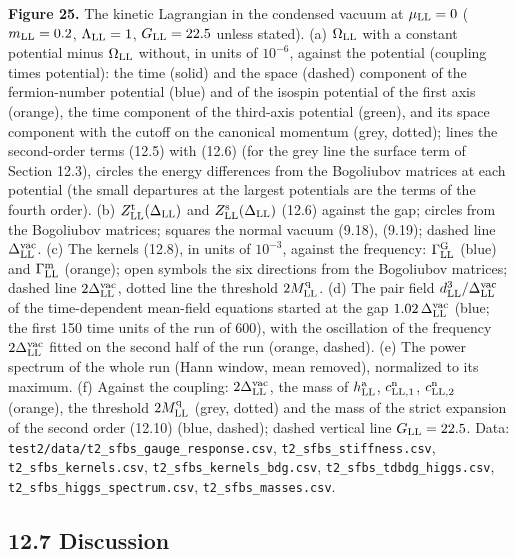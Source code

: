 \documentclass[
  10pt,
]{article}
\begin{document}
\textbf{Figure 25.} The kinetic Lagrangian in the condensed vacuum at
\(\mu_{\rm LL}=0\) (\(m_{\rm LL}=0.2\), \(\Lambda_{\rm LL}=1\),
\(G_{\rm LL}=22.5\) unless stated). (a) \(\Omega_{\rm LL}\) with a
constant potential minus \(\Omega_{\rm LL}\) without, in units of
\(10^{-6}\), against the potential (coupling times potential): the time
(solid) and the space (dashed) component of the fermion-number potential
(blue) and of the isospin potential of the first axis (orange), the time
component of the third-axis potential (green), and its space component
with the cutoff on the canonical momentum (grey, dotted); lines the
second-order terms (12.5) with (12.6) (for the grey line the surface
term of Section 12.3), circles the energy differences from the
Bogoliubov matrices at each potential (the small departures at the
largest potentials are the terms of the fourth order). (b)
\(Z^{\rm t}_{\rm LL}(\Delta_{\rm LL})\) and
\(Z^{\rm s}_{\rm LL}(\Delta_{\rm LL})\) (12.6) against the gap; circles
from the Bogoliubov matrices; squares the normal vacuum (9.18), (9.19);
dashed line \(\Delta^{\rm vac}_{\rm LL}\). (c) The kernels (12.8), in
units of \(10^{-3}\), against the frequency: \(\Gamma^{\rm G}_{\rm LL}\)
(blue) and \(\Gamma^{\rm m}_{\rm LL}\) (orange); open symbols the six
directions from the Bogoliubov matrices; dashed line
\(2\Delta^{\rm vac}_{\rm LL}\), dotted line the threshold
\(2M^{\rm q}_{\rm LL}\). (d) The pair field
\(d^3_{\rm LL}/\Delta^{\rm vac}_{\rm LL}\) of the time-dependent
mean-field equations started at the gap
\(1.02\,\Delta^{\rm vac}_{\rm LL}\) (blue; the first 150 time units of
the run of 600), with the oscillation of the frequency
\(2\Delta^{\rm vac}_{\rm LL}\) fitted on the second half of the run
(orange, dashed). (e) The power spectrum of the whole run (Hann window,
mean removed), normalized to its maximum. (f) Against the coupling:
\(2\Delta^{\rm vac}_{\rm LL}\), the mass of \(h^{\rm a}_{\rm LL}\),
\(c^{\rm n}_{{\rm LL},1}\), \(c^{\rm n}_{{\rm LL},2}\) (orange), the
threshold \(2M^{\rm q}_{\rm LL}\) (grey, dotted) and the mass of the
strict expansion of the second order (12.10) (blue, dashed); dashed
vertical line \(G_{\rm LL}=22.5\). Data:
\texttt{test2/data/t2\_sfbs\_gauge\_response.csv},
\texttt{t2\_sfbs\_stiffness.csv}, \texttt{t2\_sfbs\_kernels.csv},
\texttt{t2\_sfbs\_kernels\_bdg.csv},
\texttt{t2\_sfbs\_tdbdg\_higgs.csv},
\texttt{t2\_sfbs\_higgs\_spectrum.csv}, \texttt{t2\_sfbs\_masses.csv}.

\hypertarget{discussion-10}{%
\subsection{12.7 Discussion}\label{discussion-10}}
\end{document}
